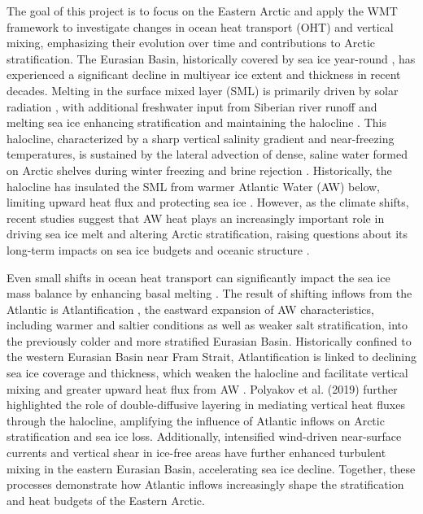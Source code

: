 \documentclass[draft]{agujournal2019}
\begin{document}
The goal of this project is to focus on the Eastern Arctic and apply the WMT framework to investigate changes in ocean heat transport (OHT) and vertical mixing, emphasizing their evolution over time and contributions to Arctic stratification. The Eurasian Basin, historically covered by sea ice year-round \cite{Kwok2018}, has experienced a significant decline in multiyear ice extent \cite{Perovich2009,perovich2011} and thickness \cite{Polyakov2012,Kwok2018} in recent decades. Melting in the surface mixed layer (SML) is primarily driven by solar radiation \cite{perovich2007}, with additional freshwater input from Siberian river runoff and melting sea ice enhancing stratification and maintaining the halocline \cite{aagaard1981}. This halocline, characterized by a sharp vertical salinity gradient and near-freezing temperatures, is sustained by the lateral advection of dense, saline water formed on Arctic shelves during winter freezing and brine rejection \cite{aagaard1981}. Historically, the halocline has insulated the SML from warmer Atlantic Water (AW) below, limiting upward heat flux and protecting sea ice \cite{aagaard1981}. However, as the climate shifts, recent studies suggest that AW heat plays an increasingly important role in driving sea ice melt and altering Arctic stratification, raising questions about its long-term impacts on sea ice budgets and oceanic structure \cite{Carmack2007,Carmack2015,Polyakov2017}.


Even small shifts in ocean heat transport can significantly impact the sea ice mass balance by enhancing basal melting \cite{Carmack2015}. The result of shifting inflows from the Atlantic is Atlantification \cite{Polyakov2017}, the eastward expansion of AW characteristics, including warmer and saltier conditions as well as weaker salt stratification, into the previously colder and more stratified Eurasian Basin. Historically confined to the western Eurasian Basin near Fram Strait, Atlantification is linked to declining sea ice coverage and thickness, which weaken the halocline and facilitate vertical mixing and greater upward heat flux from AW \cite{Polyakov2017}. Polyakov et al. (2019) further highlighted the role of double-diffusive layering in mediating vertical heat fluxes through the halocline, amplifying the influence of Atlantic inflows on Arctic stratification and sea ice loss. Additionally, intensified wind-driven near-surface currents and vertical shear in ice-free areas have further enhanced turbulent mixing in the eastern Eurasian Basin, accelerating sea ice decline. Together, these processes demonstrate how Atlantic inflows increasingly shape the stratification and heat budgets of the Eastern Arctic.
\end{document}
